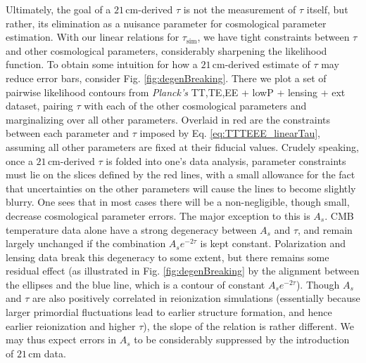 \documentclass[twocolumn,aps,prd,nofootinbib,showpacs]{revtex4-1}
\begin{document}
Ultimately, the goal of a $21\,\textrm{cm}$-derived $\tau$ is not the measurement of $\tau$ itself, but rather, its elimination as a nuisance parameter for cosmological parameter estimation. With our linear relations for $\tau_\textrm{sim}$, we have tight constraints between $\tau$ and other cosmological parameters, considerably sharpening the likelihood function. To obtain some intuition for how a $21\,\textrm{cm}$-derived estimate of $\tau$ may reduce error bars, consider Fig. \ref{fig:degenBreaking}. There we plot a set of pairwise likelihood contours from \emph{Planck's} TT,TE,EE + lowP + lensing + ext dataset, pairing $\tau$ with each of the other cosmological parameters and marginalizing over all other parameters. Overlaid in red are the constraints between each parameter and $\tau$ imposed by Eq. \eqref{eq:TTTEEE_linearTau}, assuming all other parameters are fixed at their fiducial values. Crudely speaking, once a $21\,\textrm{cm}$-derived $\tau$ is folded into one's data analysis, parameter constraints must lie on the slices defined by the red lines, with a small allowance for the fact that uncertainties on the other parameters will cause the lines to become slightly blurry. One sees that in most cases there will be a non-negligible, though small, decrease cosmological parameter errors. The major exception to this is $A_s$. CMB temperature data alone have a strong degeneracy between $A_s$ and $\tau$, and remain largely unchanged if the combination $A_s e^{-2 \tau}$ is kept constant. Polarization and lensing data break this degeneracy to some extent, but there remains some residual effect (as illustrated in Fig. \ref{fig:degenBreaking} by the alignment between the ellipses and the blue line, which is a contour of constant $A_s e^{-2 \tau}$). Though $A_s$ and $\tau$ are also positively correlated in reionization simulations (essentially because larger primordial fluctuations lead to earlier structure formation, and hence earlier reionization and higher $\tau$), the slope of the relation is rather different. We may thus expect errors in $A_s$ to be considerably suppressed by the introduction of $21\,\textrm{cm}$ data.
\end{document}
